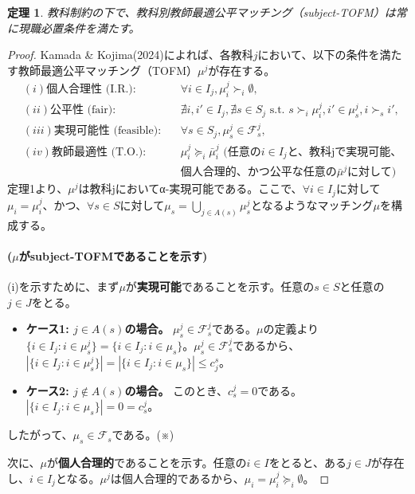 \documentclass[12pt, a4paper]{article}
\theoremstyle{definition}
\theoremstyle{remark}
\theoremstyle{plain}
\newtheorem{theorem}{定理}
\begin{document}
  
\begin{theorem}
教科制約の下で、教科別教師最適公平マッチング（subject-TOFM）は常に現職必置条件を満たす。
\end{theorem}

\begin{proof}
Kamada \& Kojima(2024)によれば、各教科$j$において、以下の条件を満たす教師最適公平マッチング（TOFM）$\mu^j$が存在する。
\begin{align*}
 &(i) \text{個人合理性 (I.R.)}: && \forall i \in I_j, \mu^j_i \succ_i \emptyset,\\
 &(ii) \text{公平性 (fair)}:  && \nexists i, i' \in I_j, \nexists s \in S_j \text{ s.t. } s \succ_i \mu^j_i, i' \in \mu^j_s, i \succ_s i',\\
 &(iii) \text{実現可能性 (feasible)}:  && \forall s \in S_j, \mu^j_s \in \mathcal{F}^j_s,\\
 &(iv) \text{教師最適性 (T.O.)}: && \mu^j_i \succeq_i \bar{\mu}^j_i \text{ (任意の$i \in I_j$と、教科jで実現可能、}\\
 & && \text{個人合理的、かつ公平な任意の$\bar{\mu}^j$に対して)}
\end{align*}
定理1より、$\mu^j$は教科jにおいてα-実現可能である。ここで、$\forall i \in I_j$に対して$\mu_i=\mu^j_i$、かつ、$\forall s \in S$に対して$\mu_s = \bigcup\limits_{j \in A(s)} \mu^j_s$となるようなマッチング$\mu$を構成する。

\paragraph{($\mu$がsubject-TOFMであることを示す)}
(i)を示すために、まず$\mu$が\textbf{実現可能}であることを示す。任意の$s \in S$と任意の$j \in J$をとる。
\begin{itemize}
    \item \textbf{ケース1: $j \in A(s)$の場合。} $\mu^j_s \in \mathcal{F}^j_s$である。$\mu$の定義より$\{i \in I_j : i \in \mu^j_s\} = \{ i \in I_j : i\in \mu_s \}$。$\mu^j_s \in \mathcal{F}^j_s$であるから、$|\{i \in I_j : i \in \mu^j_s\}| = |\{ i \in I_j : i\in \mu_s \}| \leq c_j^s$。
    \item \textbf{ケース2: $j \notin A(s)$の場合。} このとき、$c^j_s=0$である。$|\{i \in I_j : i \in \mu_s\}|= 0 = c^j_s$。
\end{itemize}
したがって、$\mu_s \in \mathcal{F}_s$である。(※)

次に、$\mu$が\textbf{個人合理的}であることを示す。任意の$i \in I$をとると、ある$j \in J$が存在し、$i \in I_j$となる。$\mu^j$は個人合理的であるから、$\mu_i = \mu^j_i \succeq_i \emptyset$。


\end{proof}
\end{document}
